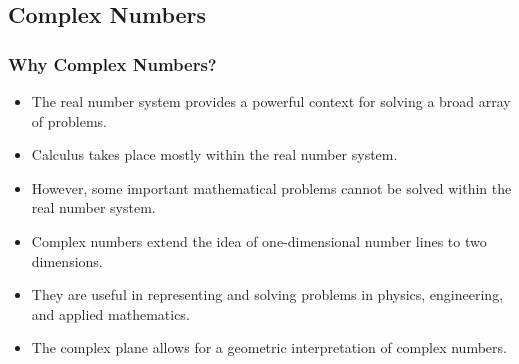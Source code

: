 \documentclass{beamer}
\begin{document}
\subsection{Complex Numbers}
\begin{frame}
\frametitle{Why Complex Numbers?}
\begin{itemize}
    \item The real number system provides a powerful context for solving a broad array of problems.
    \item Calculus takes place mostly within the real number system.
    \item However, some important mathematical problems cannot be solved within the real number system.
    \item Complex numbers extend the idea of one-dimensional number lines to two dimensions.
    \item They are useful in representing and solving problems in physics, engineering, and applied mathematics.
    \item The complex plane allows for a geometric interpretation of complex numbers.
\end{itemize}
\end{frame}
\end{document}
